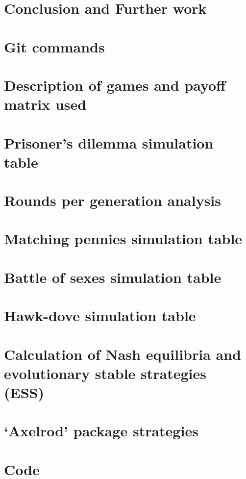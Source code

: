 \documentclass[12pt]{report}
\begin{document}
\chapter{Conclusion and Further work}


\appendix
\chapter{Git commands}


\chapter{Description of games and payoff matrix used}


\chapter{Prisoner's dilemma simulation table}


\chapter{Rounds per generation analysis}


\chapter{Matching pennies simulation table}


\chapter{Battle of sexes simulation table}


\chapter{Hawk-dove simulation table}


\chapter{Calculation of Nash equilibria and evolutionary stable strategies (ESS)}


\chapter{`Axelrod' package strategies}


\chapter{Code}


\newpage


\end{document}
